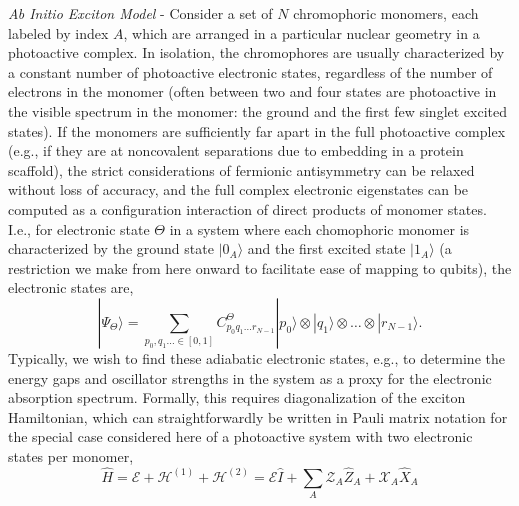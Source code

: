 \documentclass[aps,prl,twocolumn,showpacs,superscriptaddress,groupedaddress]{revtex4}  %
\begin{document}
% 
\textit{Ab Initio Exciton Model} - Consider a set of $N$ chromophoric monomers,
each
labeled by index $A$, which are arranged in a particular nuclear geometry in a
photoactive complex. In isolation, the chromophores are usually characterized by a
constant number of photoactive electronic states, regardless of the number of
electrons in the monomer (often between two and four states are photoactive in
the visible spectrum in the monomer: the ground and the first few singlet excited
states). If the monomers are sufficiently far apart in the full photoactive
complex (e.g., if they are at noncovalent separations due to embedding in a
protein scaffold), the strict considerations of fermionic antisymmetry can be
relaxed without loss of accuracy, and the full complex electronic eigenstates
can be computed as a configuration interaction of direct products of monomer
states. I.e., for electronic state $\Theta$ in a system where each chomophoric
monomer is characterized by the ground state $|0_A\rangle$ and the first excited
state $|1_A\rangle$ (a restriction we make from here onward to facilitate ease
of mapping to qubits), the electronic states are,
\begin{equation}
| \Psi_{\Theta} \rangle
=
\sum_{p_{0}, q_{1} \ldots \in [0,1]}
C_{p_{0} q_{1} \ldots r_{N-1}}^{\Theta}
|p_{0}\rangle
\otimes
|q_{1}\rangle
\otimes
\ldots
\otimes
|r_{N-1}\rangle
.
\end{equation}
Typically, we wish to find these adiabatic electronic states, e.g., to determine
the energy gaps and oscillator strengths in the system as a proxy for the
electronic absorption spectrum. Formally, this requires diagonalization of the
exciton Hamiltonian, which can straightforwardly be written in Pauli matrix
notation for the special case considered here of a photoactive system with two
electronic states per monomer,
\begin{equation}
\label{eq:Hpauli}
\hat H
=
\mathcal{E}
+
\mathcal{H}^{(1)}
+
\mathcal{H}^{(2)}
=
\mathcal{E} \hat I 
+ 
\sum_{A}
\mathcal{Z}_{A}
\hat Z_{A}
+ 
\mathcal{X}_{A}
\hat X_{A}
\end{equation}
\end{document}
